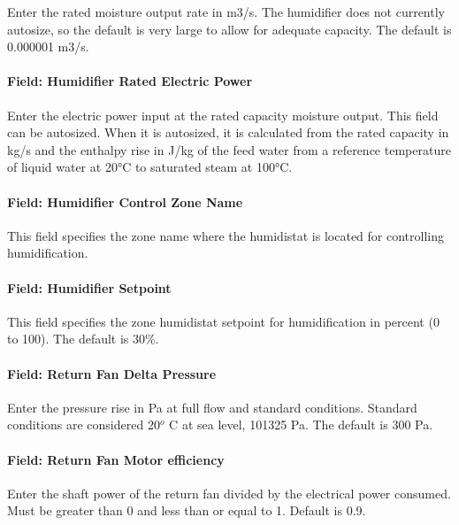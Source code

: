 Enter the rated moisture output rate in m3/s. The humidifier does not currently autosize, so the default is very large to allow for adequate capacity. The default is 0.000001 m3/s.

\paragraph{Field: Humidifier Rated Electric Power}\label{field-humidifier-rated-electric-power-1}

Enter the electric power input at the rated capacity moisture output. This field can be autosized. When it is autosized, it is calculated from the rated capacity in kg/s and the enthalpy rise in J/kg of the feed water from a reference temperature of liquid water at 20°C to saturated steam at 100°C.

\paragraph{Field: Humidifier Control Zone Name}\label{field-humidifier-control-zone-name-1}

This field specifies the zone name where the humidistat is located for controlling humidification.

\paragraph{Field: Humidifier Setpoint}\label{field-humidifier-setpoint-1}

This field specifies the zone humidistat setpoint for humidification in percent (0 to 100). The default is 30\%.

\paragraph{Field: Return Fan Delta Pressure}\label{field-return-fan-delta-pressure-1}

Enter the pressure rise in Pa at full flow and standard conditions. Standard conditions are considered 20\(^{o}\) C at sea level, 101325 Pa. The default is 300 Pa.

\paragraph{Field: Return Fan Motor efficiency}\label{field-return-fan-motor-efficiency-1}

Enter the shaft power of the return fan divided by the electrical power consumed. Must be greater than 0 and less than or equal to 1. Default is 0.9.

